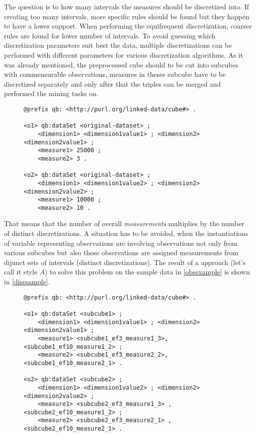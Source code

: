 The question is to how many intervals the measures should be discretized into. If creating too many intervals, more specific rules should be found but they happen to have a lower support. When performing the equifrequent discretization, coarser rules are found for lower number of intervals. To avoid guessing which discretization parameters suit best the data, multiple discretizations can be performed with different parameters for various discretization algorithms. As it was already mentioned, the preprocessed cube should to be cut into subcubes with commensurable observations, measures in theses subcube have to be discretized separately and only after that the triples can be merged and performed the mining tasks on.

\begin{figure}[h]
\begin{lstlisting}[language = turtle, caption={Observations example}, label={obsexample},captionpos=b escapeinside={(*@}{@*)}]
@prefix qb: <http://purl.org/linked-data/cube#> .

<o1> qb:dataSet <original-dataset> ;
    <dimension1> <dimension1value1> ; <dimension2> <dimension2value1> ;
    <measure1> 25000 ;
    <measure2> 3 .
    
<o2> qb:dataSet <original-dataset> ;
    <dimension1> <dimension1value2> ; <dimension2> <dimension2value2> ;
    <measure1> 10000 ;
    <measure2> 10 .
\end{lstlisting}
\end{figure}

That means that the number of overall \textit{measurements} multiplies by the number of distinct discretizations. A situation has to be avoided, when the instantiations of variable representing observations are involving observations not only from various subcubes but also those observations are assigned measurements from dijunct sets of intervals (distinct discretizations). The result of a approach (let's call it style $A$) to solve this problem on the sample data in \ref{obsexample} is shown in \ref{discsample}.

\begin{figure}[h]
\begin{lstlisting}[language = turtle, caption={Discretization example}, label={discsample},captionpos=b escapeinside={(*@}{@*)}]
@prefix qb: <http://purl.org/linked-data/cube#> .
            
<o1> qb:dataSet <subcube1> ;
    <dimension1> <dimension1value1> ; <dimension2> <dimension2value1> ;
    <measure1> <subcube1_ef3_measure1_3>, <subcube1_ef10_measure1_2> ;
    <measure2> <subcube1_ef3_measure2_2>, <subcube1_ef10_measure2_1> .
   
<o2> qb:dataSet <subcube2> ;
    <dimension1> <dimension1value2> ; <dimension2> <dimension2value2> ;
    <measure1> <subcube2_ef3_measure1_3> , <subcube2_ef10_measure1_2> ;
    <measure2> <subcube2_ef3_measure2_1> ,<subcube2_ef10_measure2_1> .
\end{lstlisting}
\end{figure}

